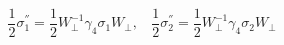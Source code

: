 \begin{equation}
\frac{1}{2} \sigma_{1}^{''} = \frac{1}{2} W_{\perp}^{-1} \gamma_{4} \sigma_{1}
W_{\perp} ,~~~~
\frac{1}{2} \sigma_{2}^{''} = \frac{1}{2} W_{\perp}^{-1} \gamma_{4} \sigma_{2}
W_{\perp} \nonumber 
\end{equation}

